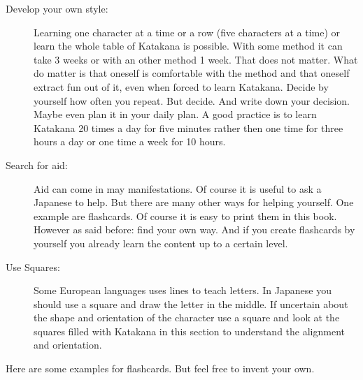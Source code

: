 \begin{description}

\item[Develop your own style:] Learning one character at a time or a row (five
characters at a time) or learn the whole table of Katakana is possible. With
some method it can take 3 weeks or with an other method 1 week. That does not
matter. What do matter is that oneself is comfortable with the method and that
oneself extract fun out of it, even when forced to learn Katakana. Decide by
yourself how often you repeat. But decide. And write down your decision. Maybe
even plan it in your daily plan. A good practice is to learn Katakana 20 times
a day for five minutes rather then one time for three hours a day or one time a
week for 10 hours. 

\item[Search for aid:] Aid can come in may manifestations. Of course it is
useful to ask a Japanese to help. But there are many other ways for helping
yourself.  One example are flashcards. Of course it is easy to print them in
this book. However as said before: find your own way. And if you create
flashcards by yourself you already learn the content up to a certain level. 

\item[Use Squares:] Some European languages uses lines to teach letters. In
Japanese you should use a square and draw the letter in the middle. If
uncertain about the shape and orientation of the character use a square and
look at the squares filled with Katakana in this section to understand the
alignment and orientation.

\end{description}

\newpage

Here are some examples for flashcards. But feel free to invent your own.


